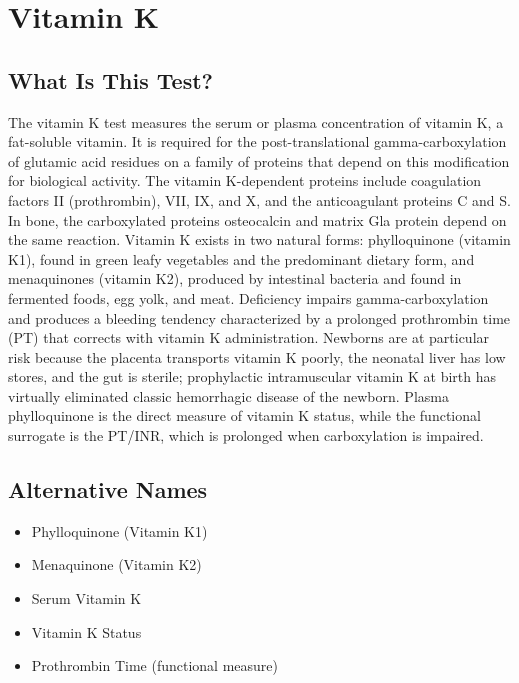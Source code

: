 \chapter{Vitamin K}

\section*{What Is This Test?}
The vitamin K test measures the serum or plasma concentration of vitamin K, a fat-soluble vitamin. It is required for the post-translational gamma-carboxylation of glutamic acid residues on a family of proteins that depend on this modification for biological activity. The vitamin K-dependent proteins include coagulation factors II (prothrombin), VII, IX, and X, and the anticoagulant proteins C and S. In bone, the carboxylated proteins osteocalcin and matrix Gla protein depend on the same reaction. Vitamin K exists in two natural forms: phylloquinone (vitamin K1), found in green leafy vegetables and the predominant dietary form, and menaquinones (vitamin K2), produced by intestinal bacteria and found in fermented foods, egg yolk, and meat. Deficiency impairs gamma-carboxylation and produces a bleeding tendency characterized by a prolonged prothrombin time (PT) that corrects with vitamin K administration. Newborns are at particular risk because the placenta transports vitamin K poorly, the neonatal liver has low stores, and the gut is sterile; prophylactic intramuscular vitamin K at birth has virtually eliminated classic hemorrhagic disease of the newborn. Plasma phylloquinone is the direct measure of vitamin K status, while the functional surrogate is the PT/INR, which is prolonged when carboxylation is impaired.

\section*{Alternative Names}
\begin{itemize}
  \item Phylloquinone (Vitamin K1)
  \item Menaquinone (Vitamin K2)
  \item Serum Vitamin K
  \item Vitamin K Status
  \item Prothrombin Time (functional measure)
\end{itemize}
